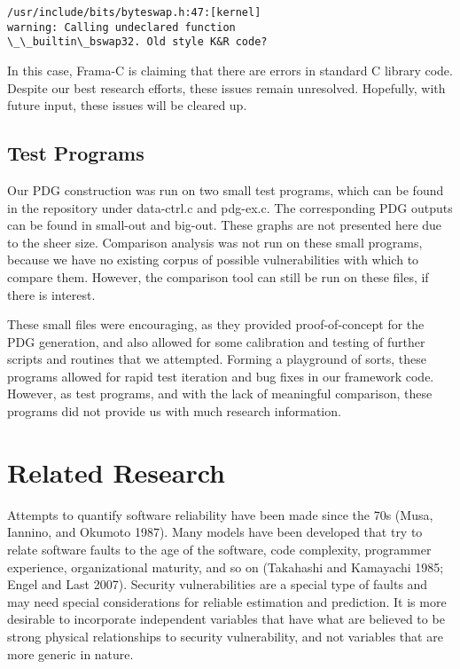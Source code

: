 \documentclass{acm_proc_article-sp}
\begin{document}
\begin{lstlisting}
/usr/include/bits/byteswap.h:47:[kernel]
warning: Calling undeclared function
\_\_builtin\_bswap32. Old style K&R code?
\end{lstlisting}

In this case, Frama-C is claiming that there are errors in standard C
library code. Despite our best research efforts, these issues remain 
unresolved. Hopefully, with future input, these issues will be cleared up.

\subsection{Test Programs}
Our PDG construction was run on two small test programs, which can be found in 
the repository under data-ctrl.c and pdg-ex.c. The corresponding PDG outputs 
can be found in small-out and big-out. These graphs are not presented here due 
to the sheer size. Comparison analysis was not run on these small programs, 
because we have no existing corpus of possible vulnerabilities with which to 
compare them. However, the comparison tool can still be run on these files, if 
there is interest.

These small files were encouraging, as they provided proof-of-concept for the 
PDG generation, and also allowed for some calibration and testing of further 
scripts and routines that we attempted. Forming a playground of sorts, these 
programs allowed for rapid test iteration and bug fixes in our framework code. 
However, as test programs, and with the lack of meaningful comparison, these 
programs did not provide us with much research information.

\section{Related Research}
Attempts to quantify software reliability have been made since the 70s (Musa, 
Iannino, and Okumoto 1987). Many models have been developed that try to relate 
software faults to the age of the software, code complexity, programmer 
experience, organizational maturity, and so on (Takahashi and Kamayachi 1985; 
Engel and Last 2007). Security vulnerabilities are a special type of faults and 
may need special considerations for reliable estimation and prediction. It is 
more desirable to incorporate independent variables that have what are believed 
to be strong physical relationships to security vulnerability, and not 
variables that are more generic in nature.
\end{document}
